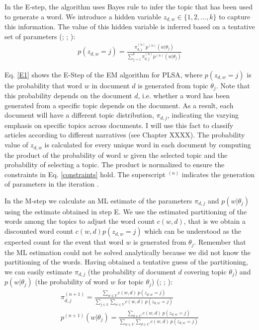 \documentclass[11pt,a4paper,english,oneside]{book}
\numberwithin{equation}{chapter}
\begin{document}
In the E-step, the algorithm uses Bayes rule to infer the topic that has been used to generate a word. We introduce a hidden variable $z_{d,w} \in \{1,2,...,k\}$ to capture this information. The value of this hidden variable is inferred based on a tentative set of parameters (\citealp[p. 290]{Hofmann.1999}; \citeyear[p. 182]{Hofmann.2001}; \citealp[p. 362--374]{Zhai.2016}):
\begin{align}\label{E1}
p(z_{d,w}=j)=\frac{\pi_{d,j}^{(n)}p^{(n)}(w|\theta_j)}{\sum_{j=1}^{k}\pi_{d,j}^{(n)}p^{(n)}(w|\theta_j)}
\end{align}

Eq. \ref{E1} shows the E-Step of the EM algorithm for PLSA, where $p(z_{d,w}=j)$ is the probability that word $w$ in document $d$ is generated from topic $\theta_j$. Note that this probability depends on the document $d$, i.e. whether a word has been generated from a specific topic depends on the document. As a result, each document will have a different topic distribution, $\pi_{d,j}$, indicating the varying emphasis on specific topics across documents. I will use this fact to classify articles according to different narratives (see Chapter XXXX).  The probability value of $z_{d,w}$ is calculated for every unique word in each document by computing the product of the probability of word $w$ given the selected topic and the probability of selecting a topic. The product is normalized to ensure the constraints in Eq. \ref{constraints} hold. The superscript $^{(n)}$ indicates the generation of parameters in the iteration \citep[p. 374--376]{Zhai.2016}.  

In the M-step we calculate an ML estimate of the parameters $\pi_{d,j}$ and $p(w|\theta_j)$ using the estimate obtained in step E. We use the estimated partitioning of the words among the topics to adjust the word count $c(w,d)$, that is we obtain a discounted word count $c(w,d) p(z_{d,w}=j)$ which can be understood as the expected count for the event that word $w$ is generated from $\theta_j$. Remember that the ML estimation could not be solved analytically because we did not know the partitioning of the words. Having obtained a tentative guess of the partitioning, we can easily estimate $\pi_{d,j}$ (the probability of document $d$ covering topic $\theta_j$) and $p(w|\theta_j)$ (the probability of word $w$ for topic $\theta_j$) (\citealp[p. 290]{Hofmann.1999}; \citeyear[p. 182]{Hofmann.2001}; \citealp[p. 364--375]{Zhai.2016}):
\begin{align}%
\label{M1pi} \pi_{d,j}^{(n+1)}=\frac{\sum_{w \in V} c(w,d)\ p(z_{d,w}=j)}{\sum_{j \in k}\sum_{w \in V}c(w,d) \ p(z_{d,w}=j)}\\
\label{M1theta} p^{(n+1)}(w|\theta_j)=\frac{\sum_{d \in C} c(w,d)\ p(z_{d,w}=j)}{\sum_{w \in V}\sum_{d \in C}c(w,d)\ p(z_{d,w}=j)}
\end{align}
\end{document}
